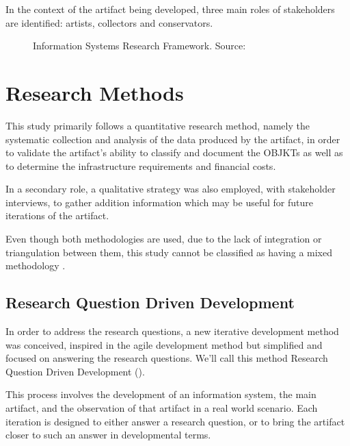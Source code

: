 In the context of the artifact being developed, three main roles of stakeholders are identified: artists, collectors and conservators.

\begin{figure}[h]
    \centering
    
    \caption[Information Systems Research Framework]{Information Systems Research Framework. Source: \cite[p.80]{hevnerDesignScienceInformation2004}}
    \label{fig:is-research-framework}
\end{figure}



\section{Research Methods}

This study primarily follows a quantitative research method, namely the systematic collection and analysis of the data produced by the artifact, in order to validate the artifact's ability to classify and document the OBJKTs as well as to determine the infrastructure requirements and financial costs.

In a secondary role, a qualitative strategy was also employed, with stakeholder interviews, to gather addition information which may be useful for future iterations of the artifact.

Even though both methodologies are used, due to the lack of integration or triangulation between them, this study cannot be classified as having a mixed methodology \cite{turnerResearchDesignMixed2017}.


\subsection{Research Question Driven Development}

In order to address the research questions, a new iterative development method was conceived, inspired in the agile development method \cite{shoreArtAgileDevelopment2021} but simplified and focused on answering the research questions. We'll call this method Research Question Driven Development ().

This process involves the development of an information system, the main artifact, and the observation of that artifact in a real world scenario. Each iteration is designed to either answer a research question, or to bring the artifact closer to such an answer in developmental terms.

